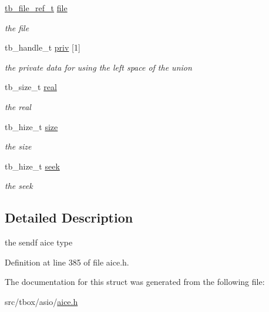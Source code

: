 \begin{DoxyCompactItemize}
\item 
\hypertarget{structtb__aice__sendf__t_ad359c44df72f16877a503a9b2f16a598}{\hyperlink{structtb__file__ref__t}{tb\-\_\-file\-\_\-ref\-\_\-t} \hyperlink{structtb__aice__sendf__t_ad359c44df72f16877a503a9b2f16a598}{file}}\label{structtb__aice__sendf__t_ad359c44df72f16877a503a9b2f16a598}

\begin{DoxyCompactList}\small\item\em the file \end{DoxyCompactList}\item 
\hypertarget{structtb__aice__sendf__t_a50a19f10b27cfaa2fbf0cf93b733df40}{tb\-\_\-handle\-\_\-t \hyperlink{structtb__aice__sendf__t_a50a19f10b27cfaa2fbf0cf93b733df40}{priv} \mbox{[}1\mbox{]}}\label{structtb__aice__sendf__t_a50a19f10b27cfaa2fbf0cf93b733df40}

\begin{DoxyCompactList}\small\item\em the private data for using the left space of the union \end{DoxyCompactList}\item 
\hypertarget{structtb__aice__sendf__t_a8a6414bbfbd091b062818c2fcd6c907f}{tb\-\_\-size\-\_\-t \hyperlink{structtb__aice__sendf__t_a8a6414bbfbd091b062818c2fcd6c907f}{real}}\label{structtb__aice__sendf__t_a8a6414bbfbd091b062818c2fcd6c907f}

\begin{DoxyCompactList}\small\item\em the real \end{DoxyCompactList}\item 
\hypertarget{structtb__aice__sendf__t_a647c286dac2d8b0015c0c9740d58368c}{tb\-\_\-hize\-\_\-t \hyperlink{structtb__aice__sendf__t_a647c286dac2d8b0015c0c9740d58368c}{size}}\label{structtb__aice__sendf__t_a647c286dac2d8b0015c0c9740d58368c}

\begin{DoxyCompactList}\small\item\em the size \end{DoxyCompactList}\item 
\hypertarget{structtb__aice__sendf__t_ac9134bf1d67067998e8f249b27c017d1}{tb\-\_\-hize\-\_\-t \hyperlink{structtb__aice__sendf__t_ac9134bf1d67067998e8f249b27c017d1}{seek}}\label{structtb__aice__sendf__t_ac9134bf1d67067998e8f249b27c017d1}

\begin{DoxyCompactList}\small\item\em the seek \end{DoxyCompactList}\end{DoxyCompactItemize}


\subsection{Detailed Description}
the sendf aice type 

Definition at line 385 of file aice.\-h.



The documentation for this struct was generated from the following file\-:\begin{DoxyCompactItemize}
\item 
src/tbox/asio/\hyperlink{aice_8h}{aice.\-h}\end{DoxyCompactItemize}

